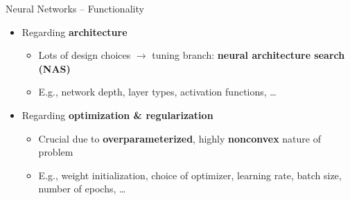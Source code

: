 \begin{frame}{Neural Networks -- Functionality}
\begin{itemize}
  \item Regarding \textbf{architecture}
  \begin{itemize}
    \item Lots of design choices $\rightarrow$ tuning branch: \textbf{neural 
    architecture search (NAS)}
    \item E.g., network depth, layer types, activation functions, \dots
  \end{itemize}
  \item Regarding \textbf{optimization \& regularization}
  \begin{itemize}
    \item Crucial due to \textbf{overparameterized}, highly \textbf{nonconvex} 
    nature of problem
    \item E.g., weight initialization, choice of optimizer, learning rate, 
    batch size, number of epochs, \dots
  \end{itemize}
\end{itemize}

\medskip


\end{frame}


